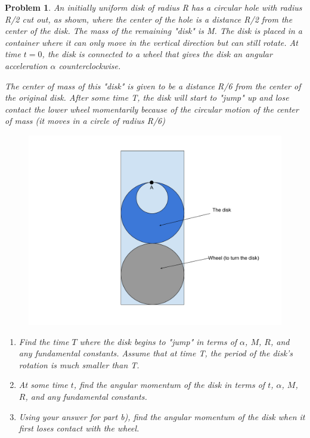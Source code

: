 \documentclass[12pt]{article}
\newcommand{\clearpts}{\addtocounter{tpts}{\value{cpts}} \setcounter{cpts}{0}}
\newcommand{\pts}[1]{\clearpts \setcounter{cpts}{#1}}
\theoremstyle{mystyle}
\newtheorem{pproblem}{Problem}
\begin{document}
\pts{10}
\begin{pproblem}
    An initially uniform disk of radius R has a circular hole with radius R/2 cut out, as shown, where the center of the hole is a distance R/2 from the center of the disk. The mass of the remaining "disk" is M. The disk is placed in a container where it can only move in the vertical direction but can still rotate. At time $t = 0$, the disk is connected to a wheel that gives the disk an angular acceleration $\alpha$ counterclockwise. 

    The center of mass of this "disk" is given to be a distance R/6 from the center of the original disk. After some time T, the disk will start to "jump" up and lose contact the lower wheel momentarily because of the circular motion of the center of mass (it moves in a circle of radius R/6)
     
    \begin{figure}[H]
        \centering
        \includegraphics[scale=0.5]{rotationsTestDiskProblem (1).pdf}
    \end{figure}
    \begin{enumerate}[\Alph*)]
        \item Find the time $T$ where the disk begins to "jump" in terms of $\alpha$, $M$, $R$, and any fundamental constants. Assume that at time T, the period of the disk's rotation is much smaller than T. 
        \item At some time $t$, find the angular momentum of the disk in terms of $t$, $\alpha$, $M$, $R$, and any fundamental constants.
        \item Using your answer for part b), find the angular momentum of the disk when it first loses contact with the wheel. 
    \end{enumerate}
\end{pproblem}
\end{document}
